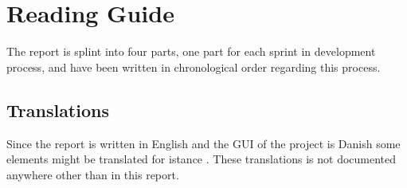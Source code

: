 
\section*{Reading Guide}
The report is splint into four parts, one part for each sprint in development process, and have been written in chronological order regarding this process. 

\subsection*{Translations}
\label{sub:translations}
Since the report is written in English and the GUI of the project is Danish some elements might be translated for istance 
. These translations is not documented anywhere other than in this report.
